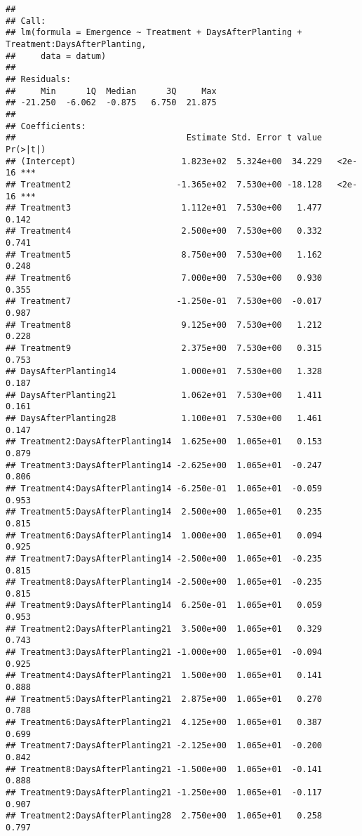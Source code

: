 \documentclass[
]{article}
\begin{document}
\begin{verbatim}
## 
## Call:
## lm(formula = Emergence ~ Treatment + DaysAfterPlanting + Treatment:DaysAfterPlanting, 
##     data = datum)
## 
## Residuals:
##     Min      1Q  Median      3Q     Max 
## -21.250  -6.062  -0.875   6.750  21.875 
## 
## Coefficients:
##                                  Estimate Std. Error t value Pr(>|t|)    
## (Intercept)                     1.823e+02  5.324e+00  34.229   <2e-16 ***
## Treatment2                     -1.365e+02  7.530e+00 -18.128   <2e-16 ***
## Treatment3                      1.112e+01  7.530e+00   1.477    0.142    
## Treatment4                      2.500e+00  7.530e+00   0.332    0.741    
## Treatment5                      8.750e+00  7.530e+00   1.162    0.248    
## Treatment6                      7.000e+00  7.530e+00   0.930    0.355    
## Treatment7                     -1.250e-01  7.530e+00  -0.017    0.987    
## Treatment8                      9.125e+00  7.530e+00   1.212    0.228    
## Treatment9                      2.375e+00  7.530e+00   0.315    0.753    
## DaysAfterPlanting14             1.000e+01  7.530e+00   1.328    0.187    
## DaysAfterPlanting21             1.062e+01  7.530e+00   1.411    0.161    
## DaysAfterPlanting28             1.100e+01  7.530e+00   1.461    0.147    
## Treatment2:DaysAfterPlanting14  1.625e+00  1.065e+01   0.153    0.879    
## Treatment3:DaysAfterPlanting14 -2.625e+00  1.065e+01  -0.247    0.806    
## Treatment4:DaysAfterPlanting14 -6.250e-01  1.065e+01  -0.059    0.953    
## Treatment5:DaysAfterPlanting14  2.500e+00  1.065e+01   0.235    0.815    
## Treatment6:DaysAfterPlanting14  1.000e+00  1.065e+01   0.094    0.925    
## Treatment7:DaysAfterPlanting14 -2.500e+00  1.065e+01  -0.235    0.815    
## Treatment8:DaysAfterPlanting14 -2.500e+00  1.065e+01  -0.235    0.815    
## Treatment9:DaysAfterPlanting14  6.250e-01  1.065e+01   0.059    0.953    
## Treatment2:DaysAfterPlanting21  3.500e+00  1.065e+01   0.329    0.743    
## Treatment3:DaysAfterPlanting21 -1.000e+00  1.065e+01  -0.094    0.925    
## Treatment4:DaysAfterPlanting21  1.500e+00  1.065e+01   0.141    0.888    
## Treatment5:DaysAfterPlanting21  2.875e+00  1.065e+01   0.270    0.788    
## Treatment6:DaysAfterPlanting21  4.125e+00  1.065e+01   0.387    0.699    
## Treatment7:DaysAfterPlanting21 -2.125e+00  1.065e+01  -0.200    0.842    
## Treatment8:DaysAfterPlanting21 -1.500e+00  1.065e+01  -0.141    0.888    
## Treatment9:DaysAfterPlanting21 -1.250e+00  1.065e+01  -0.117    0.907    
## Treatment2:DaysAfterPlanting28  2.750e+00  1.065e+01   0.258    0.797    

\end{verbatim}
\end{document}
